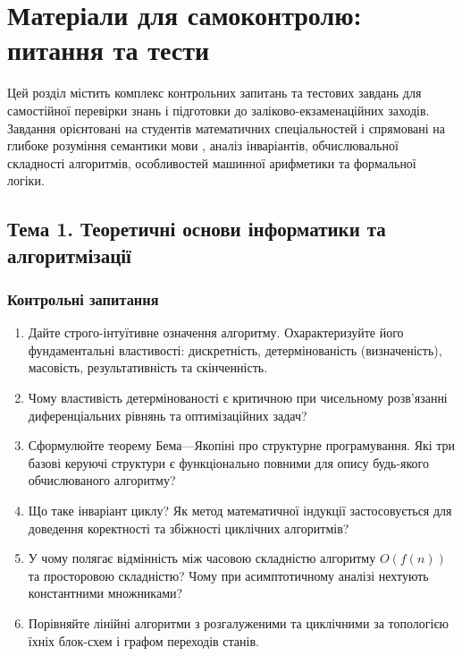 
\chapter{Матеріали для самоконтролю: питання та тести}
\justifying

Цей розділ містить комплекс контрольних запитань та тестових завдань для самостійної перевірки знань і підготовки до заліково-екзаменаційних заходів. Завдання орієнтовані на студентів математичних спеціальностей і спрямовані на глибоке розуміння семантики мови \Python, аналіз інваріантів, обчислювальної складності алгоритмів, особливостей машинної арифметики та формальної логіки.

\section{Тема 1. Теоретичні основи інформатики та алгоритмізації}

\subsection*{Контрольні запитання}
\begin{enumerate}[label=\textbf{1.\arabic*.}]
	\item Дайте строго-інтуїтивне означення алгоритму. Охарактеризуйте його фундаментальні властивості: дискретність, детермінованість (визначеність), масовість, результативність та скінченність.
	\item Чому властивість детермінованості є критичною при чисельному розв'язанні диференціальних рівнянь та оптимізаційних задач?
	\item Сформулюйте теорему Бема---Якопіні про структурне програмування. Які три базові керуючі структури є функціонально повними для опису будь-якого обчислюваного алгоритму?
	\item Що таке інваріант циклу? Як метод математичної індукції застосовується для доведення коректності та збіжності циклічних алгоритмів?
	\item У чому полягає відмінність між часовою складністю алгоритму $O(f(n))$ та просторовою складністю? Чому при асимптотичному аналізі нехтують константними множниками?
	\item Порівняйте лінійні алгоритми з розгалуженими та циклічними за топологією їхніх блок-схем і графом переходів станів.
\end{enumerate}


